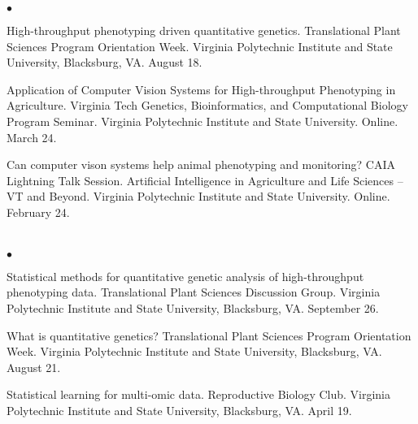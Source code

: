 \documentclass[margin,line,10pt]{res}
\newenvironment{list2}{
  \begin{list}{$\bullet$}{%
      \setlength{\itemsep}{0in}
      \setlength{\parsep}{0in} \setlength{\parskip}{0in}
      \setlength{\topsep}{0in} \setlength{\partopsep}{0in} 
      \setlength{\leftmargin}{0.2in}}}{\end{list}}
\begin{document}
\begin{resume}
\begin{list2}
    \vspace{0.5cm}


    \item High-throughput phenotyping driven quantitative genetics. Translational Plant Sciences Program Orientation Week. Virginia Polytechnic Institute and State University, Blacksburg, VA. August 18.

          \vspace{0.5cm}

\item Application of Computer Vision Systems for High-throughput Phenotyping in Agriculture. Virginia Tech Genetics, Bioinformatics, and Computational Biology Program Seminar. Virginia Polytechnic Institute and State University. Online. March 24. 

  \vspace{0.5cm}


  \item Can computer vison systems help animal phenotyping and monitoring? CAIA Lightning Talk Session. Artificial Intelligence in Agriculture and Life Sciences – VT and Beyond. Virginia Polytechnic Institute and State University. Online. February 24. 
\end{list2}





\section{}
\begin{list2}
\item Statistical methods for quantitative genetic analysis of high-throughput phenotyping data. Translational Plant Sciences Discussion Group. Virginia Polytechnic Institute and State University, Blacksburg, VA. September 26.

  \vspace{0.5cm}

\item What is quantitative genetics? Translational Plant Sciences Program Orientation Week. Virginia Polytechnic Institute and State University, Blacksburg, VA. August 21.
  
  \vspace{0.5cm}

\item Statistical learning for multi-omic data. Reproductive Biology Club. Virginia Polytechnic Institute and State University, Blacksburg, VA. April 19. 
\end{list2}  


\end{resume}
\end{document}

